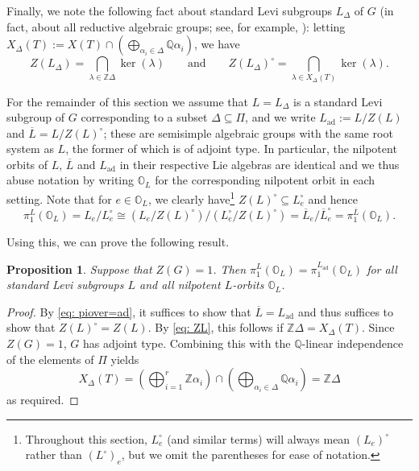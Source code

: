 \documentclass[11pt]{amsart}
\renewcommand{\O}{{\mathbb O}}
\newcommand{\bZ}{{\mathbb Z}}
\newcommand{\bQ}{{\mathbb Q}}
\newcommand{\ad}{{\operatorname{ad}}}
\newtheorem{prop}[theorem]{Proposition}
\numberwithin{equation}{section}
\begin{document}
	Finally, we note the following fact about standard Levi subgroups $L_\Delta$ of $G$ (in fact, about all reductive algebraic groups; see, for example, \cite[II.1.18]{JanRAGS}): letting $X_\Delta(T):=X(T)\cap(\bigoplus_{\alpha_i\in\Delta}\bQ \alpha_i)$, we have \begin{equation}\label{eq: ZL} Z(L_\Delta)=\bigcap_{\lambda\in \bZ\Delta}\ker(\lambda)\qquad\mbox{and}\qquad Z(L_\Delta)^\circ=\bigcap_
		{\lambda\in X_\Delta(T)} \ker(\lambda).\end{equation}
	
	For the remainder of this section we assume that $L=L_\Delta$ is a standard Levi subgroup of $G$ corresponding to a subset $\Delta\subseteq \Pi$, and we write $L_{\ad}:=L/Z(L)$ and $\overline{L}=L/Z(L)^\circ$; these are semisimple algebraic groups with the same root system as $L$, the former of which is of adjoint type. In particular, the nilpotent orbits of $L$, $\overline{L}$ and $L_{\ad}$ in their respective Lie algebras are identical and we thus abuse notation by writing $\O_L$ for the corresponding nilpotent orbit in each setting. Note that for $e\in\O_L$, we clearly have\footnote{Throughout this section, $L_e^\circ $ (and similar terms) will always mean $(L_e)^\circ$ rather than $(L^\circ)_e$, but we omit the parentheses for ease of notation.} $Z(L)^\circ \subseteq L_e^\circ$ and hence
	\begin{equation}\label{eq: piover=ad}
		\pi_1^L(\O_L)=L_e/L_e^\circ \cong (L_e/Z(L)^\circ)/(L_e^\circ/Z(L)^\circ)=\overline{L}_e/\overline{L}_e^\circ=\pi_1^{\overline{L}}(\O_L).
	\end{equation}
	
	Using this, we can prove the following result.
	
	\begin{prop}\label{prop: adj fun gp}
		Suppose that $Z(G)=1$. Then $\pi_1^L(\O_L)=\pi_1^{L_\ad}(\O_L)$ for all standard Levi subgroups $L$ and all nilpotent $L$-orbits $\O_L$.
	\end{prop}
	
	\begin{proof}
		By \eqref{eq: piover=ad}, it suffices to show that $\overline{L}=L_\ad$ and thus suffices to show that $Z(L)^\circ=Z(L)$. By \eqref{eq: ZL}, this follows if $\bZ\Delta=X_\Delta(T)$. Since $Z(G)=1$, $G$ has adjoint type. Combining this with the $\bQ$-linear independence of the elements of $\Pi$ yields $$X_\Delta(T)=(\bigoplus_{i=1}^{r}\bZ\alpha_i)\cap(\bigoplus_{\alpha_i\in\Delta}\bQ\alpha_i)=\bZ\Delta$$ as required.
	\end{proof}
	
\end{document}
